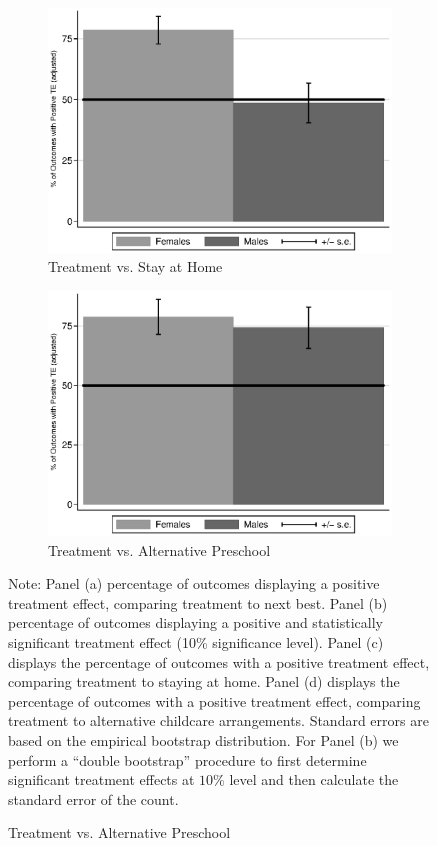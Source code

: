 \begin{figure}
\begin{subfigure}[h]{0.4\textwidth}
		\caption{ Treatment vs. Stay at Home} \label{fig:ppositivehome}
		\includegraphics[width=\textwidth]{output/epan_ipw_p0_all.eps}
\end{subfigure}%
\begin{subfigure}[h]{0.4\textwidth}
	\centering
	\caption{Treatment vs. Alternative Preschool} \label{fig:ppositivealternative}
		\includegraphics[width=\textwidth]{output/epan_ipw_p1_all.eps}
\end{subfigure}
\scriptsize \justify
Note: Panel (a) percentage of outcomes displaying a positive treatment effect, comparing treatment to next best. Panel (b) percentage of outcomes displaying a positive and statistically significant treatment effect (10\% significance level). Panel (c) displays the percentage of outcomes with a positive treatment effect, comparing treatment to staying at home. Panel (d) displays the percentage of outcomes with a positive treatment effect, comparing treatment to alternative childcare arrangements. Standard errors are based on the empirical bootstrap distribution. For Panel (b) we perform a ``double bootstrap'' procedure to first determine significant treatment effects at $10\%$ level and then calculate the standard error of the count.\\
\end{figure}

